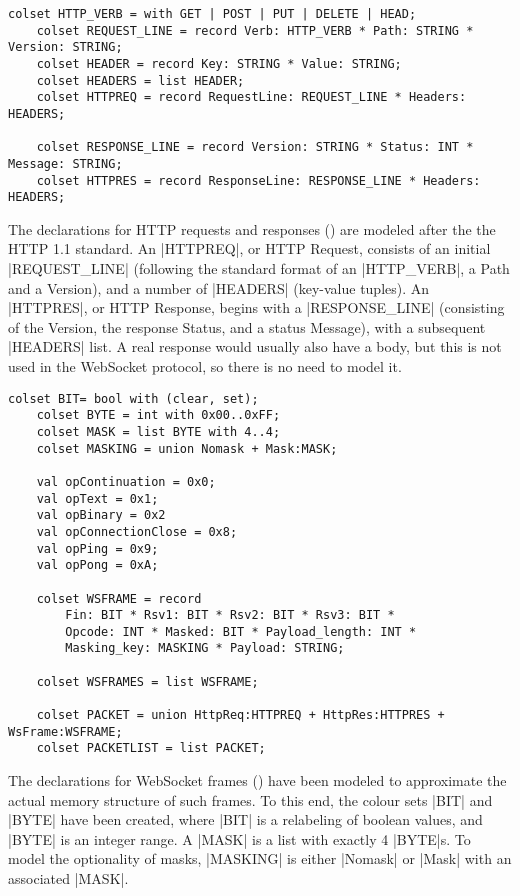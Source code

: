 	\begin{lstlisting}[label=lst:client_lib_colset_http,caption=HTTP colour
	sets,gobble=1,float=h]
	colset HTTP_VERB = with GET | POST | PUT | DELETE | HEAD;
	colset REQUEST_LINE = record Verb: HTTP_VERB * Path: STRING * Version: STRING;
	colset HEADER = record Key: STRING * Value: STRING;
	colset HEADERS = list HEADER;
	colset HTTPREQ = record RequestLine: REQUEST_LINE *	Headers: HEADERS;
	
	colset RESPONSE_LINE = record Version: STRING * Status: INT * Message: STRING;
	colset HTTPRES = record ResponseLine: RESPONSE_LINE * Headers: HEADERS;
	\end{lstlisting}
	
	The declarations for HTTP requests and responses
	() are modeled after the  the HTTP 1.1
	standard. An |HTTPREQ|, or HTTP Request, consists of an initial |REQUEST_LINE|
	(following the standard format of an |HTTP_VERB|, a Path and a Version), and a
	number of |HEADERS| (key-value tuples).
	An |HTTPRES|, or HTTP Response, begins with a |RESPONSE_LINE| (consisting of
	the Version, the response Status, and a status Message), with a subsequent
	|HEADERS| list. A real response would usually also have a body, but this is not
	used in the WebSocket protocol, so there is no need to model it.
	
	\begin{lstlisting}[label=lst:client_lib_colset_ws,caption=WebSocket colour
	sets,gobble=1,float] 
	colset BIT= bool with (clear, set);
	colset BYTE = int with 0x00..0xFF;
	colset MASK = list BYTE with 4..4;
	colset MASKING = union Nomask + Mask:MASK;
	
	val opContinuation = 0x0;
	val opText = 0x1;
	val opBinary = 0x2
	val opConnectionClose = 0x8;
	val opPing = 0x9;
	val opPong = 0xA;
	
	colset WSFRAME = record
		Fin: BIT * Rsv1: BIT * Rsv2: BIT * Rsv3: BIT * 
		Opcode: INT * Masked: BIT * Payload_length: INT * 
		Masking_key: MASKING * Payload: STRING;
	
	colset WSFRAMES = list WSFRAME;
	
	colset PACKET = union HttpReq:HTTPREQ + HttpRes:HTTPRES + WsFrame:WSFRAME;
	colset PACKETLIST = list PACKET;
	\end{lstlisting}
	
	The declarations for WebSocket frames () have
	been modeled to approximate the actual memory structure of such frames. To this
	end, the colour sets |BIT| and |BYTE| have been created, where |BIT| is a
	relabeling of boolean values, and |BYTE| is an integer range. A |MASK| is a
	list with exactly 4 |BYTE|s. To model the optionality of masks, |MASKING| is
	either |Nomask| or |Mask| with an associated |MASK|.
	
